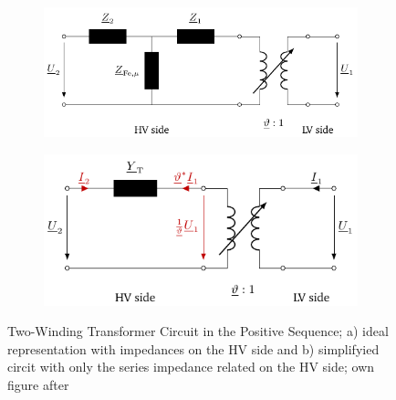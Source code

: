 \begin{figure}%
    \centering
    \captionsetup[subfigure]{justification=centering} 
    \begin{subfigure}[c]{.53\textwidth}
        \centering
        \includegraphics[width=\linewidth]{tikz_graphics/images/transformer_complete.pdf}
        \caption{}
    \end{subfigure}
    \begin{subfigure}[c]{.46\textwidth}
        \centering
        \includegraphics[width=\linewidth]{tikz_graphics/images/transformer_reduced.pdf}
        \caption{}
    \end{subfigure}
    \caption[Two-Winding Transformer Circuit in the Positive Sequence]{Two-Winding Transformer Circuit in the Positive Sequence; a) ideal representation with impedances on the \acs{HV} side and b) simplifyied circit with only the series impedance related on the \acs{HV} side; own figure after \autocite{machowski_2020,kundur_2022,milano_2010}}
    \label{fig:trafo-model}
\end{figure}

